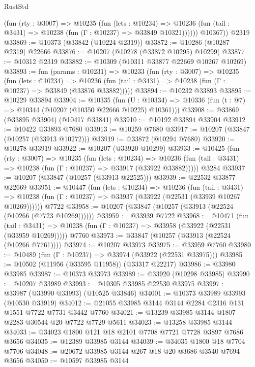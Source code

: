 \begin{lexlean}{RustStd}
\begin{coremodule}
            (fun (rty : @3007) =>
            @10235
              (fun (lets : @10234) =>
              @10236 (fun (tail : @3431) => @10238 (fun (Γ : @10237) => @33849 @10321))))))
        @10367))
    @2319
@33869 := @10373 (@33842 (@10224 @2319))
@33872 := @10286 (@10287 @2319) @22666
@33876 := @10207 (@10278 (@33872 @10295) @10299)
@33877 := @10312 @2319
@33882 := @10309 (@10311 @33877 @22669 @10267 @10269)
@33893 := fun (params : @10231) =>
  @10233
    (fun (rty : @3007) =>
    @10235
      (fun (lets : @10234) =>
      @10236 (fun (tail : @3431) => @10238 (fun (Γ : @10237) => @33849 (@33876 @33882)))))
@33894 := @10232 @33893
@33895 := @10229 @33894
@33904 := @10335
    (fun (U : @10334) => @10336 (fun (t : @7) => @10344 (@10207 (@10350 @22666 @10225) @10361)))
@33908 := @33869 (@33895 @33904) (@10417 @33841)
@33910 := @10192 @33894 @33904
@33912 := @10422 @33893 @7680
@33913 := @10259 @7680
@33917 := @10207 (@33847 (@10257 (@33913 @10272)))
@33919 := @33872 (@10294 @7680)
@33920 := @10278 @33919
@33922 := @10207 (@33920 @10299)
@33933 := @10425
    (fun (rty : @3007) =>
    @10235
      (fun (lets : @10234) =>
      @10236 (fun (tail : @3431) => @10238 (fun (Γ : @10237) => @33917 (@33922 @33882)))))
    @3284
@33937 := @10207 (@33847 (@10257 (@33913 @22525)))
@33939 := @22532 @33877 @22669
@33951 := @10447
    (fun (lets : @10234) =>
    @10236
      (fun (tail : @3431) =>
      @10238 (fun (Γ : @10237) => @33937 (@33922 (@22531 (@33939 @10267 @10269))))))
    @7722
@33958 := @10207 (@33847 (@10257 (@33913 (@22524 (@10266 (@7723 @10269))))))
@33959 := @33939 @7722
@33968 := @10471
    (fun (tail : @3431) => @10238 (fun (Γ : @10237) => @33958 (@33922 (@22531 (@33959 @10269)))))
    @7760
@33973 := @33847 (@10257 (@33913 (@22524 (@10266 @7761))))
@33974 := @10207 @33973
@33975 := @33959 @7760
@33980 := @10489 (fun (Γ : @10237) => @33974 (@33922 (@22531 @33975)))
@33985 := @10502 (@11956 (@33595 @11958)) (@33317 @22217)
@33986 := @33980 @33985
@33987 := @10373 @33973
@33989 := @33920 (@10298 @33985)
@33990 := @10207 @33989
@33993 := @10305 @33985 @22530 @33975
@33997 := @33987 (@33990 @33993) (@10525 @33846)
@34001 := @10373 @33989 @33993 (@10530 @33919)
@34012 := @21055 @33985 @3144 @3144 @2284 @2316 @131 @1551 @7722 @7731 @3442 @7760
@34021 := @13239 @33985 @3144 @1807 @2283 @30544 @20 @7722 @7729 @5611
@34023 := @13258 @33985 @3144
@34033 := @34023 @1800 @121 @18 @2101 @7708 @7721 @7728 @3897 @7686 @3656
@34035 := @12389 @33985 @3144
@34039 := @34035 @1800 @18 @7704 @7706
@34048 := @20672 @33985 @3144 @267 @18 @20 @3686 @3540 @7694 @3656
@34050 := @10597 @33985 @3144

\end{coremodule}
\end{lexlean}
